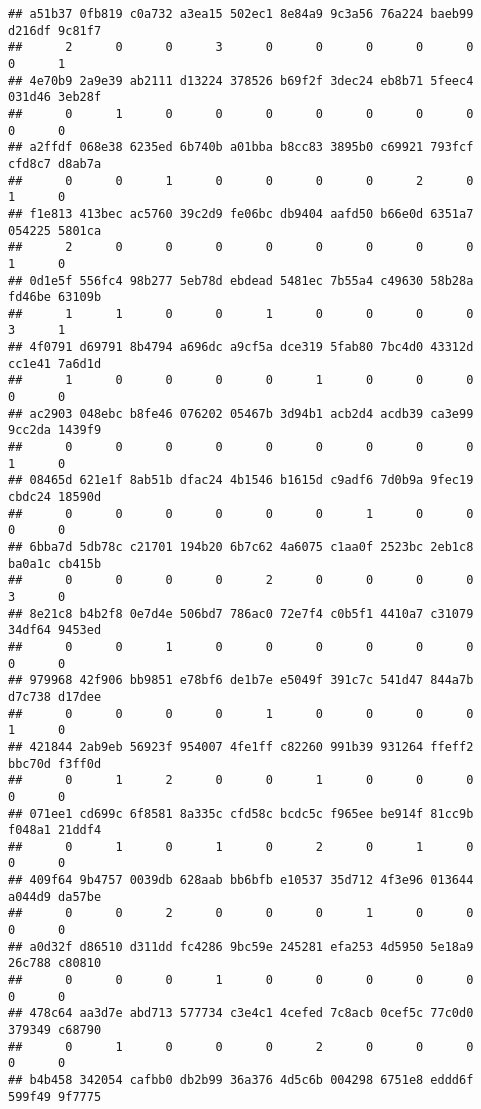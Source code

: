 \documentclass[
]{article}
\begin{document}
\begin{verbatim}
## a51b37 0fb819 c0a732 a3ea15 502ec1 8e84a9 9c3a56 76a224 baeb99 d216df 9c81f7 
##      2      0      0      3      0      0      0      0      0      0      1 
## 4e70b9 2a9e39 ab2111 d13224 378526 b69f2f 3dec24 eb8b71 5feec4 031d46 3eb28f 
##      0      1      0      0      0      0      0      0      0      0      0 
## a2ffdf 068e38 6235ed 6b740b a01bba b8cc83 3895b0 c69921 793fcf cfd8c7 d8ab7a 
##      0      0      1      0      0      0      0      2      0      1      0 
## f1e813 413bec ac5760 39c2d9 fe06bc db9404 aafd50 b66e0d 6351a7 054225 5801ca 
##      2      0      0      0      0      0      0      0      0      1      0 
## 0d1e5f 556fc4 98b277 5eb78d ebdead 5481ec 7b55a4 c49630 58b28a fd46be 63109b 
##      1      1      0      0      1      0      0      0      0      3      1 
## 4f0791 d69791 8b4794 a696dc a9cf5a dce319 5fab80 7bc4d0 43312d cc1e41 7a6d1d 
##      1      0      0      0      0      1      0      0      0      0      0 
## ac2903 048ebc b8fe46 076202 05467b 3d94b1 acb2d4 acdb39 ca3e99 9cc2da 1439f9 
##      0      0      0      0      0      0      0      0      0      1      0 
## 08465d 621e1f 8ab51b dfac24 4b1546 b1615d c9adf6 7d0b9a 9fec19 cbdc24 18590d 
##      0      0      0      0      0      0      1      0      0      0      0 
## 6bba7d 5db78c c21701 194b20 6b7c62 4a6075 c1aa0f 2523bc 2eb1c8 ba0a1c cb415b 
##      0      0      0      0      2      0      0      0      0      3      0 
## 8e21c8 b4b2f8 0e7d4e 506bd7 786ac0 72e7f4 c0b5f1 4410a7 c31079 34df64 9453ed 
##      0      0      1      0      0      0      0      0      0      0      0 
## 979968 42f906 bb9851 e78bf6 de1b7e e5049f 391c7c 541d47 844a7b d7c738 d17dee 
##      0      0      0      0      1      0      0      0      0      1      0 
## 421844 2ab9eb 56923f 954007 4fe1ff c82260 991b39 931264 ffeff2 bbc70d f3ff0d 
##      0      1      2      0      0      1      0      0      0      0      0 
## 071ee1 cd699c 6f8581 8a335c cfd58c bcdc5c f965ee be914f 81cc9b f048a1 21ddf4 
##      0      1      0      1      0      2      0      1      0      0      0 
## 409f64 9b4757 0039db 628aab bb6bfb e10537 35d712 4f3e96 013644 a044d9 da57be 
##      0      0      2      0      0      0      1      0      0      0      0 
## a0d32f d86510 d311dd fc4286 9bc59e 245281 efa253 4d5950 5e18a9 26c788 c80810 
##      0      0      0      1      0      0      0      0      0      0      0 
## 478c64 aa3d7e abd713 577734 c3e4c1 4cefed 7c8acb 0cef5c 77c0d0 379349 c68790 
##      0      1      0      0      0      2      0      0      0      0      0 
## b4b458 342054 cafbb0 db2b99 36a376 4d5c6b 004298 6751e8 eddd6f 599f49 9f7775 

\end{verbatim}
\end{document}
